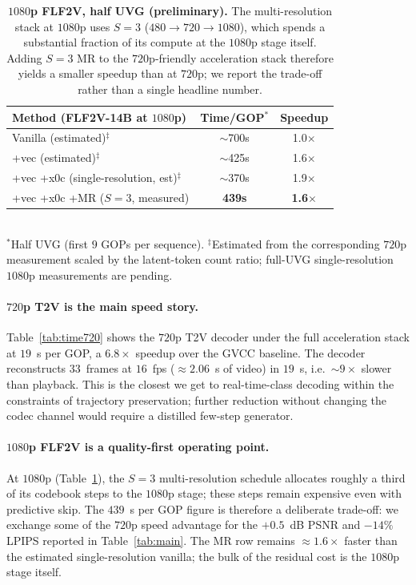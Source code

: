 \begin{table}[t]
\centering
\caption{\textbf{$1080$p FLF2V, half UVG (preliminary).} The
multi-resolution stack at $1080$p uses $S\!=\!3$
($480\!\to\!720\!\to\!1080$), which spends a substantial fraction of
its compute at the $1080$p stage itself. Adding $S\!=\!3$ MR to the
$720$p-friendly acceleration stack therefore yields a smaller speedup
than at $720$p; we report the trade-off rather than a single headline
number.}
\label{tab:time1080}
\small
\begin{tabular}{@{}l c c@{}}
\toprule
Method (FLF2V-14B at $1080$p) & Time/GOP$^\ast$ & Speedup \\
\midrule
Vanilla (estimated)$^\ddagger$       & $\sim$700s & 1.0$\times$ \\
+vec (estimated)$^\ddagger$          & $\sim$425s & 1.6$\times$ \\
+vec +x0c (single-resolution, est)$^\ddagger$  & $\sim$370s & 1.9$\times$ \\
\rowcolor{wacvblue!10}
+vec +x0c +MR ($S\!=\!3$, measured)              & \textbf{439s} & \textbf{1.6$\times$} \\
\bottomrule
\end{tabular}
\\[2pt]
{\footnotesize $^\ast$Half UVG (first $9$ GOPs per sequence). $^\ddagger$Estimated from the corresponding $720$p measurement scaled by the latent-token count ratio; full-UVG single-resolution $1080$p measurements are pending.}
\end{table}

\paragraph{$720$p T2V is the main speed story.}
Table~\ref{tab:time720} shows the $720$p T2V decoder under the full
acceleration stack at $19$~s per GOP, a $6.8\times$ speedup over the
GVCC baseline. The decoder reconstructs $33$~frames at $16$~fps
($\approx 2.06$~s of video) in $19$~s, i.e.\ $\sim 9\times$ slower
than playback. This is the closest we get to real-time-class decoding
within the constraints of trajectory preservation; further reduction
without changing the codec channel would require a distilled few-step
generator.

\paragraph{$1080$p FLF2V is a quality-first operating point.}
At $1080$p (Table~\ref{tab:time1080}), the $S\!=\!3$ multi-resolution
schedule allocates roughly a third of its codebook steps to the
$1080$p stage; these steps remain expensive even with predictive skip.
The $439$~s per GOP figure is therefore a deliberate trade-off: we
exchange some of the $720$p speed advantage for the $+0.5$~dB PSNR
and $-14\%$ LPIPS reported in Table~\ref{tab:main}. The MR row remains
$\approx 1.6\times$ faster than the estimated single-resolution
vanilla; the bulk of the residual cost is the $1080$p stage itself.
